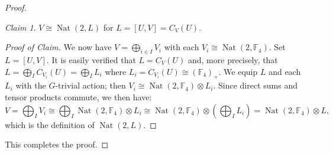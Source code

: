 \documentclass[a4paper, 11pt]{amsart}
\theoremstyle{plain}
\theoremstyle{definition}
\theoremstyle{remark}
\newtheorem{claim}{Claim}
\newenvironment{proofclaim}[1][Proof of Claim]{\begin{proof}[#1]\renewcommand{\qedsymbol}{$\lozenge$}}{\end{proof}}
\DeclareMathOperator{\Nat}{Nat}
\newcommand{\bF}{\mathbb{F}}
\begin{document}
\begin{proof}
\begin{claim}\label{l.Alt5Recognition:cl:Nat(2,L)}
$V\cong \Nat(2, L)$ for $L = [U,V]= C_V(U)$.
\end{claim}
\begin{proofclaim}
We now have $V= \bigoplus_{i\in I} V_i$ with each $V_i \cong \Nat(2,\bF_4)$.
Set $L = [U,V]$. %
It is easily verified that $L = C_V(U)$ and,
more precisely, that $L = \bigoplus_I C_{V_i}(U) = \bigoplus_I L_i$ where $L_i = C_{V_i}(U) \cong(\bF_4)_+$.
We equip $L$ and each $L_i$ with the $G$-trivial action; then $V_i \cong \Nat(2, \bF_4) \otimes L_i$. Since direct sums and tensor products commute, we then have:
\[V = \bigoplus_I V_i \cong \bigoplus_I \Nat(2, \bF_4) \otimes L_i \cong \Nat(2, \bF_4) \otimes \left(\bigoplus_I L_i\right) = \Nat(2, \bF_4) \otimes L,\]
which is the definition of $\Nat(2, L)$.
%
\end{proofclaim}
This completes the proof.
\end{proof}\setcounter{claim}{0}
\end{document}
